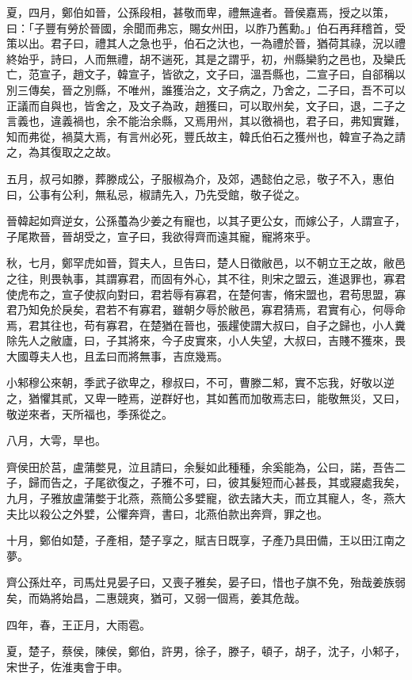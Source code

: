 \begin{pinyinscope}
夏，四月，鄭伯如晉，公孫段相，甚敬而卑，禮無違者。晉侯嘉焉，授之以策，曰：「子豐有勞於晉國，余聞而弗忘，賜女州田，以胙乃舊勳。」伯石再拜稽首，受策以出。君子曰，禮其人之急也乎，伯石之汏也，一為禮於晉，猶荷其祿，況以禮終始乎，詩曰，人而無禮，胡不遄死，其是之謂乎，初，州縣欒豹之邑也，及欒氏亡，范宣子，趙文子，韓宣子，皆欲之，文子曰，溫吾縣也，二宣子曰，自郤稱以別三傳矣，晉之別縣，不唯州，誰獲治之，文子病之，乃舍之，二子曰，吾不可以正議而自與也，皆舍之，及文子為政，趙獲曰，可以取州矣，文子曰，退，二子之言義也，違義禍也，余不能治余縣，又焉用州，其以徼禍也，君子曰，弗知實難，知而弗從，禍莫大焉，有言州必死，豐氏故主，韓氏伯石之獲州也，韓宣子為之請之，為其復取之之故。

五月，叔弓如滕，葬滕成公，子服椒為介，及郊，遇懿伯之忌，敬子不入，惠伯曰，公事有公利，無私忌，椒請先入，乃先受館，敬子從之。

晉韓起如齊逆女，公孫蠆為少姜之有寵也，以其子更公女，而嫁公子，人謂宣子，子尾欺晉，晉胡受之，宣子曰，我欲得齊而遠其寵，寵將來乎。

秋，七月，鄭罕虎如晉，賀夫人，旦告曰，楚人日徵敝邑，以不朝立王之故，敝邑之往，則畏執事，其謂寡君，而固有外心，其不往，則宋之盟云，進退罪也，寡君使虎布之，宣子使叔向對曰，君若辱有寡君，在楚何害，脩宋盟也，君苟思盟，寡君乃知免於戾矣，君若不有寡君，雖朝夕辱於敝邑，寡君猜焉，君實有心，何辱命焉，君其往也，苟有寡君，在楚猶在晉也，張趯使謂大叔曰，自子之歸也，小人糞除先人之敝廬，曰，子其將來，今子皮實來，小人失望，大叔曰，吉賤不獲來，畏大國尊夫人也，且孟曰而將無事，吉庶幾焉。

小邾穆公來朝，季武子欲卑之，穆叔曰，不可，曹滕二邾，實不忘我，好敬以逆之，猶懼其貳，又卑一睦焉，逆群好也，其如舊而加敬焉志曰，能敬無災，又曰，敬逆來者，天所福也，季孫從之。

八月，大雩，旱也。

齊侯田於莒，盧蒲嫳見，泣且請曰，余髮如此種種，余奚能為，公曰，諾，吾告二子，歸而告之，子尾欲復之，子雅不可，曰，彼其髮短而心甚長，其或寢處我矣，九月，子雅放盧蒲嫳于北燕，燕簡公多嬖寵，欲去諸大夫，而立其寵人，冬，燕大夫比以殺公之外嬖，公懼奔齊，書曰，北燕伯款出奔齊，罪之也。

十月，鄭伯如楚，子產相，楚子享之，賦吉日既享，子產乃具田備，王以田江南之夢。

齊公孫灶卒，司馬灶見晏子曰，又喪子雅矣，晏子曰，惜也子旗不免，殆哉姜族弱矣，而媯將始昌，二惠競爽，猶可，又弱一個焉，姜其危哉。

四年，春，王正月，大雨雹。

夏，楚子，蔡侯，陳侯，鄭伯，許男，徐子，滕子，頓子，胡子，沈子，小邾子，宋世子，佐淮夷會于申。


\end{pinyinscope}
